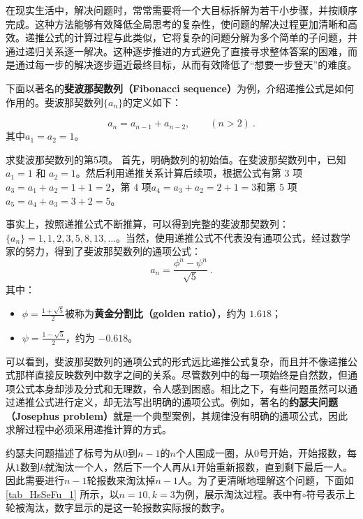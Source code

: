 在现实生活中，解决问题时，常常需要将一个大目标拆解为若干小步骤，并按顺序完成。这种方法能够有效降低全局思考的复杂性，使问题的解决过程更加清晰和高效。递推公式的计算过程与此类似，它将复杂的问题分解为多个简单的子问题，并通过递归关系逐一解决。这种逐步推进的方式避免了直接寻求整体答案的困难，而是通过每一步的解决逐步逼近最终目标，从而有效降低了“想要一步登天”的难度。

下面以著名的\textbf{斐波那契数列（Fibonacci sequence）}为例，介绍递推公式是如何作用的。斐波那契数列$\{a_n\}$的定义如下：

\begin{equation}
a_n = a_{n-1} + a_{n-2},\qquad(n>2)~.
\end{equation}
其中$a_1 =  a_2 =1$。

\begin{example}{求斐波那契数列的第5项。}
首先，明确数列的初始值。在斐波那契数列中，已知 $a_1 = 1$ 和 $a_2 = 1$。然后利用递推关系计算后续项，根据公式有第 $3$ 项$a_3 =a_1 +a_2= 1 + 1 = 2$，第 $4$ 项$a_4 = a_3 + a_2 = 2 + 1 = 3$和第 $5$ 项$a_5 = a_4 + a_3 = 3 + 2 = 5$。
\end{example}

事实上，按照递推公式不断推算，可以得到完整的斐波那契数列：$\{a_n\} = 1, 1, 2, 3, 5, 8, 13, \dots$。当然，使用递推公式不代表没有通项公式，经过数学家的努力，得到了斐波那契数列的通项公式：
\begin{equation}
a_n = \frac{\phi^n - \psi^n}{\sqrt{5}}~.
\end{equation}
其中：
\begin{itemize}
\item $\displaystyle\phi = \frac{1+\sqrt{5}}{2}$被称为\textbf{黄金分割比（golden ratio）}，约为 $1.618$；
\item $\displaystyle\psi = \frac{1-\sqrt{5}}{2}$，约为 $-0.618$。
\end{itemize}

可以看到，斐波那契数列的通项公式的形式远比递推公式复杂，而且并不像递推公式那样直接反映数列中数字之间的关系。尽管数列中的每一项始终是自然数，但通项公式本身却涉及分式和无理数，令人感到困惑。相比之下，有些问题虽然可以通过递推公式进行定义，却无法写出明确的通项公式。例如，著名的\textbf{约瑟夫问题（Josephus problem）}就是一个典型案例，其规律没有明确的通项公式，因此求解过程中必须采用递推计算的方式。

约瑟夫问题描述了标号为从$0$到$n-1$的$n$个人围成一圈，从$0$号开始，开始报数，每从$1$数到$k$就淘汰一个人，然后下一个人再从$1$开始重新报数，直到剩下最后一人。因此需要进行$n-1$轮报数来淘汰掉$n-1$人。为了更清晰地理解这个问题，下面如\autoref{tab_HsSeFu_1} 所示，以$n=10,k=3$为例，展示淘汰过程。表中有$\circ$符号表示上轮被淘汰，数字显示的是这一轮报数实际报的数字。

